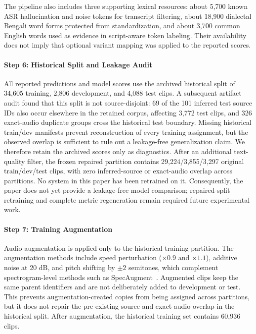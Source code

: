 \documentclass[journal]{IEEEtran}
\begin{document}
The pipeline also includes three supporting lexical resources: about 5{,}700
known ASR hallucination and noise tokens for transcript filtering, about
18{,}900 dialectal Bengali word forms protected from standardization, and about
3{,}700 common English words used as evidence in script-aware token labeling.
Their availability does not imply that optional variant mapping was applied to
the reported scores.

\paragraph*{Step 6: Historical Split and Leakage Audit}

All reported predictions and model scores use the archived historical split of 34{,}605 training, 2{,}806 development, and 4{,}088 test clips. A subsequent artifact audit found that this split is not source-disjoint: 69 of the 101 inferred test source IDs also occur elsewhere in the retained corpus, affecting 3{,}772 test clips, and 326 exact-audio duplicate groups cross the historical test boundary. Missing historical train/dev manifests prevent reconstruction of every training assignment, but the observed overlap is sufficient to rule out a leakage-free generalization claim. We therefore retain the archived scores only as diagnostics. After an additional text-quality filter, the frozen repaired partition contains 29{,}224/3{,}855/3{,}297 original train/dev/test clips, with zero inferred-source or exact-audio overlap across partitions. No system in this paper has been retrained on it. Consequently, the paper does not yet provide a leakage-free model comparison; repaired-split retraining and complete metric regeneration remain required future experimental work.

\paragraph*{Step 7: Training Augmentation}

Audio augmentation is applied only to the historical training partition. The augmentation methods include speed perturbation ($\times0.9$ and $\times1.1$), additive noise at 20 dB, and pitch shifting by $\pm2$ semitones, which complement spectrogram-level methods such as SpecAugment~\cite{park2019specaugment}. Augmented clips keep the same parent identifiers and are not deliberately added to development or test. This prevents augmentation-created copies from being assigned across partitions, but it does not repair the pre-existing source and exact-audio overlap in the historical split. After augmentation, the historical training set contains 60{,}936 clips.
\end{document}
